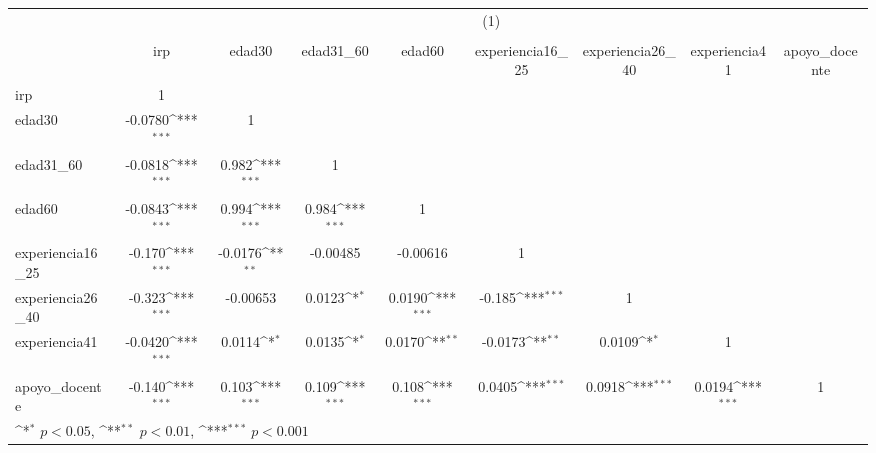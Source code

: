 {
\def\sym#1{\ifmmode^{#1}\else\(^{#1}\)\fi}
\begin{tabular}{l*{8}{c}}
\hline\hline
          &\multicolumn{8}{c}{(1)}                                                                                                                                \\
          &\multicolumn{8}{c}{}                                                                                                                                   \\
          &      irp         &   edad30         &edad31\_60         &   edad60         &experiencia16\_25         &experiencia26\_40         &experiencia41         &apoyo\_docente         \\
\hline
irp       &        1         &                  &                  &                  &                  &                  &                  &                  \\
edad30    &  -0.0780\sym{***}&        1         &                  &                  &                  &                  &                  &                  \\
edad31\_60 &  -0.0818\sym{***}&    0.982\sym{***}&        1         &                  &                  &                  &                  &                  \\
edad60    &  -0.0843\sym{***}&    0.994\sym{***}&    0.984\sym{***}&        1         &                  &                  &                  &                  \\
experiencia16\_25&   -0.170\sym{***}&  -0.0176\sym{**} & -0.00485         & -0.00616         &        1         &                  &                  &                  \\
experiencia26\_40&   -0.323\sym{***}& -0.00653         &   0.0123\sym{*}  &   0.0190\sym{***}&   -0.185\sym{***}&        1         &                  &                  \\
experiencia41&  -0.0420\sym{***}&   0.0114\sym{*}  &   0.0135\sym{*}  &   0.0170\sym{**} &  -0.0173\sym{**} &   0.0109\sym{*}  &        1         &                  \\
apoyo\_docente&   -0.140\sym{***}&    0.103\sym{***}&    0.109\sym{***}&    0.108\sym{***}&   0.0405\sym{***}&   0.0918\sym{***}&   0.0194\sym{***}&        1         \\
\hline\hline
\multicolumn{9}{l}{\footnotesize \sym{*} \(p<0.05\), \sym{**} \(p<0.01\), \sym{***} \(p<0.001\)}\\
\end{tabular}
}
